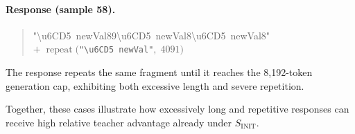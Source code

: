 \paragraph{Response (sample 58).}
\begin{quote}
\small\ttfamily
"\textbackslash u6CD5\ newVal89\textbackslash u6CD5\ newVal8\textbackslash u6CD5\ newVal8"\\
\normalfont $+\;\operatorname{repeat}($\texttt{"\textbackslash u6CD5\ newVal"}$,\;4091)$
\end{quote}
The response repeats the same fragment until it reaches the 8,192-token
generation cap, exhibiting both excessive length and severe repetition.

Together, these cases illustrate how excessively long and repetitive responses can receive
high relative teacher advantage already under $S_{\mathrm{INIT}}$.
